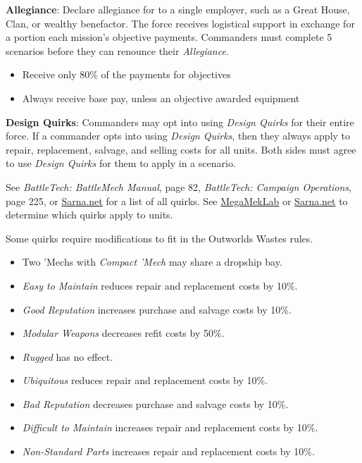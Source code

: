 \item {\bfseries Allegiance}: Declare allegiance for to a single employer, such as a Great House, Clan, or wealthy benefactor.
The force receives logistical support in exchange for a portion each mission's objective payments.
Commanders must complete 5 scenarios before they can renounce their \emph{Allegiance}.

\begin{itemize}

\item Receive only 80\% of the payments for objectives

\item Always receive base pay, unless an objective awarded equipment

\end{itemize}

\item {\bfseries Design Quirks}: Commanders may opt into using \emph{Design Quirks} for their entire force.
If a commander opts into using \emph{Design Quirks}, then they always apply to repair, replacement, salvage, and selling costs for all units.
Both sides must agree to use \emph{Design Quirks} for them to apply in a scenario.

See \emph{BattleTech: BattleMech Manual}, page 82, \emph{BattleTech: Campaign Operations}, page 225, or \href{https://sarna.net}{Sarna.net} for a list of all quirks.
See \href{https://megamek.org}{MegaMekLab} or \href{https://sarna.net}{Sarna.net} to determine which quirks apply to units.

Some quirks require modifications to fit in the Outworlds Wastes rules.

\begin{itemize}

\item Two 'Mechs with \emph{Compact 'Mech} may share a dropship bay.

\item \emph{Easy to Maintain} reduces repair and replacement costs by 10\%.

\item \emph{Good Reputation} increases purchase and salvage costs by 10\%.

\item \emph{Modular Weapons} decreases refit costs by 50\%.

\item \emph{Rugged} has no effect.

\item \emph{Ubiquitous} reduces repair and replacement costs by 10\%.

\item \emph{Bad Reputation} decreases purchase and salvage costs by 10\%.

\item \emph{Difficult to Maintain} increases repair and replacement costs by 10\%.

\item \emph{Non-Standard Parts} increases repair and replacement costs by 10\%.

\end{itemize}

